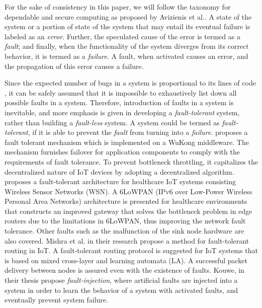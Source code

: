 For the sake of consistency in this paper, we will follow the taxonomy for dependable and secure computing as proposed by Avizienis et al.\cite{Avizienis2004}. A state of the system or a portion of state of the system that may entail its eventual failure is labeled as an \textit{error}. Further, the speculated cause of the error is termed as a \textit{fault}; and finally, when the functionality of the system diverges from its correct behavior, it is termed as a \textit{failure}. A fault, when activated causes an error, and the propagation of this error causes a failure\cite{Cinque2013}. 

Since the expected number of bugs in a system is proportional to its lines of code \cite{Lipow1982}, it can be safely assumed that it is impossible to exhaustively list down all possible faults in a system. Therefore, introduction of faults in a system is inevitable, and more emphasis is given in developing a \textit{fault-tolerant} system, rather than building a \textit{fault-less} system. A system could be termed as \textit{fault-tolerant}, if it is able to prevent the \textit{fault} from turning into a \textit{failure}. \cite{Su2014} proposes a fault tolerant mechanism which is implemented on a WuKong\cite{Lin2016} middleware. The mechanism furnishes failover for application components to comply with the requirements of fault tolerance. To prevent bottleneck throttling, it capitalizes the decentralized nature of IoT devices by adopting a decentralized algorithm. \cite{Gia2015} proposes a fault-tolerant architecture for healthcare IoT systems consisting Wireless Sensor Networks (WSN). A 6LoWPAN (IPv6 over Low-Power Wireless Personal Area Networks) architecture is presented for healthcare environments that constructs an improved gateway that solves the bottleneck problem in edge routers due to the limitations in 6LoWPAN, thus improving the network fault tolerance. Other faults such as the malfunction of the sink node\cite{Chen2013} hardware are also covered. Mishra et al. in their research\cite{Misra2012} propose a method for fault-tolerant routing in IoT. A fault-tolerant routing protocol is suggested for IoT systems that is based on mixed cross-layer and learning automata (LA). A successful packet delivery between nodes is assured even with the existence of faults. Kouwe, in their thesis\cite{96b050fa82334e38993854b4a4714f90} propose \textit{fault-injection}, where artificial faults are injected into a system in order to learn the behavior of a system with activated faults, and eventually prevent system failure.

